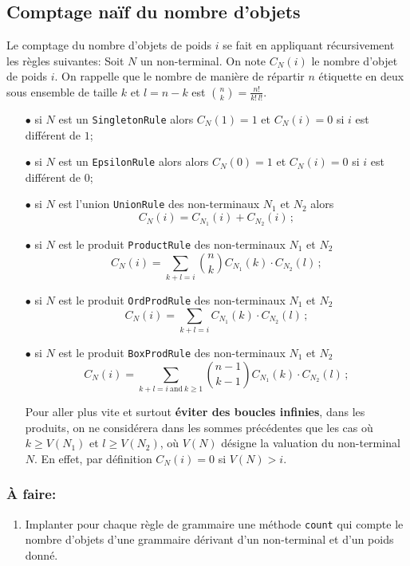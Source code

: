 \documentclass[11pt]{article}
\renewcommand{\emph}[1]{\textbf{#1}}
\newcounter{asuivre}
\newenvironment{asks}{\begin{enumerate}\setcounter{enumi}{\theasuivre}}%
                       {\setcounter{asuivre}{\theenumi}\end{enumerate}}
\newcommand{\EpsilonRule}{\texttt{EpsilonRule}\xspace}
\newcommand{\SingletonRule}{\texttt{SingletonRule}\xspace}
\newcommand{\UnionRule}{\texttt{UnionRule}\xspace}
\newcommand{\ProductRule}{\texttt{ProductRule}\xspace}
\newcommand{\BoxProdRule}{\texttt{BoxProdRule}\xspace}
\newcommand{\OrdProdRule}{\texttt{OrdProdRule}\xspace}
\newcommand{\cnt}{\texttt{count}\xspace}
\begin{document}
\subsection{Comptage naïf du nombre d'objets}

Le comptage du nombre d'objets de poids $i$ se fait en appliquant
récursivement les règles suivantes:
Soit $N$ un non-terminal. On note $C_N(i)$ le nombre d'objet de poids $i$.
On rappelle que le nombre de manière de répartir $n$ étiquette en deux sous
ensemble de taille $k$ et $l=n-k$ est $\binom{n}{k} = \frac{n!}{k!\,l!}$.
\begin{itemize}
\item[$\bullet$] si $N$ est un \SingletonRule alors $C_N(1) = 1$ et $C_N(i)
  = 0$ si $i$ est différent de $1$;
\item[$\bullet$] si $N$ est un \EpsilonRule alors alors $C_N(0) = 1$ et
  $C_N(i) = 0$ si $i$ est différent de $0$;
\item[$\bullet$] si $N$ est l'union \UnionRule des non-terminaux $N_1$ et
  $N_2$ alors
  $$C_N(i) = C_{N_1}(i) + C_{N_2}(i)\,;$$
\item[$\bullet$] si $N$ est le produit \ProductRule des non-terminaux $N_1$ et
  $N_2$
  $$C_N(i) = \sum_{k+l=i} \binom{n}{k} C_{N_1}(k) \cdot C_{N_2}(l)\,;$$
\item[$\bullet$] si $N$ est le produit \OrdProdRule des non-terminaux $N_1$ et
  $N_2$
  $$C_N(i) = \sum_{k+l=i} C_{N_1}(k) \cdot C_{N_2}(l)\,;$$
\item[$\bullet$] si $N$ est le produit \BoxProdRule des non-terminaux $N_1$ et
  $N_2$
  $$C_N(i) = \sum_{k+l=i\ \text{and}\ k \geq 1}
  \binom{n-1}{k-1} C_{N_1}(k) \cdot C_{N_2}(l)\,;$$

  Pour aller plus vite et surtout \emph{éviter des boucles infinies}, dans les
  produits, on ne considérera dans les sommes précédentes que les cas où $k \geq
  V(N_1)$ et $l \geq V(N_2)$, où $V(N)$ désigne la valuation du non-terminal
  $N$. En effet, par définition $C_N(i) = 0$ si $V(N) > i$.
\end{itemize}

\subsubsection{À faire:}
\begin{asks}
\item Implanter pour chaque règle de grammaire une méthode \cnt qui compte le
  nombre d'objets d'une grammaire dérivant d'un non-terminal et d'un poids
  donné.
\end{asks}
\end{document}
